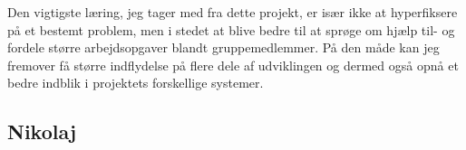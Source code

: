 Den vigtigste læring, jeg tager med fra dette projekt, er især ikke at hyperfiksere på et bestemt problem, men i stedet at blive bedre til at sprøge om hjælp til- og fordele større arbejdsopgaver blandt gruppemedlemmer. På den måde kan jeg fremover få større indflydelse på flere dele af udviklingen og dermed også opnå et bedre indblik i projektets forskellige systemer.

\newpage

\subsection{Nikolaj}
